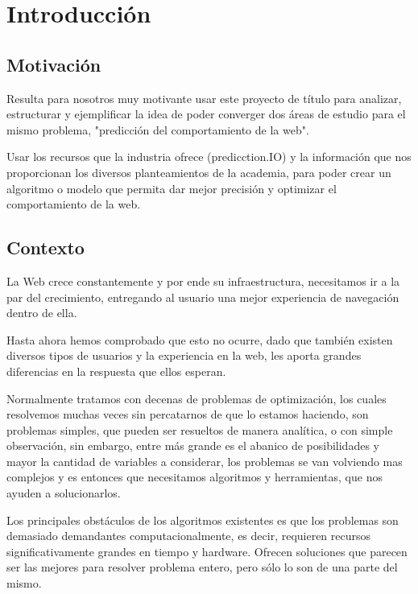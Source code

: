 \chapter[Introducción]{Introducción}
\label{ch:intro}

\section{Motivación}
\label{sec:motivacion}
Resulta para nosotros muy motivante usar este proyecto de título para analizar, estructurar y ejemplificar la idea de  poder converger dos áreas de estudio para el mismo problema, "predicción del comportamiento de la web". 

Usar los recursos que la industria ofrece (predicction.IO) y la información que nos proporcionan los diversos planteamientos de la academia, para poder crear un algoritmo o modelo que permita dar mejor precisión y optimizar el comportamiento de la web.

\section{Contexto}
\label{sec:contexto}

  La Web crece constantemente y por ende su infraestructura, necesitamos ir a la par del crecimiento, entregando al usuario una mejor experiencia de navegación dentro de ella.
  
  Hasta ahora hemos comprobado que esto no ocurre, dado que también existen diversos tipos de usuarios y la experiencia en la web, les aporta grandes diferencias en la respuesta que ellos esperan.
  
  Normalmente tratamos con decenas de problemas de optimización, los cuales resolvemos muchas veces sin percatarnos de que lo estamos haciendo, son problemas simples, que pueden ser resueltos de manera analítica, o con simple observación, sin embargo, entre más grande es el abanico de posibilidades y mayor la cantidad de variables a considerar, los problemas se van volviendo mas complejos y es entonces que necesitamos algoritmos y herramientas, que nos ayuden a solucionarlos.
  
  Los principales obstáculos de los algoritmos existentes es que los problemas son demasiado demandantes computacionalmente, es decir, requieren recursos significativamente grandes en tiempo y hardware. Ofrecen soluciones que parecen ser las mejores para resolver problema entero, pero sólo lo son de una parte del mismo.
  
